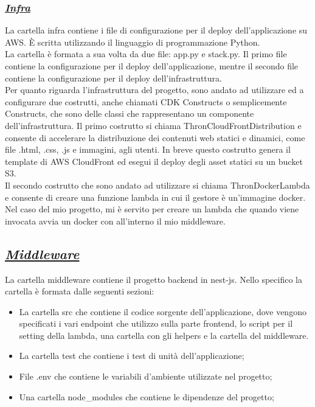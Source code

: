 \subsubsection*{\normalsize\textit{\uline{Infra}}}
La cartella infra contiene i file di configurazione per il deploy dell'applicazione su AWS. È scritta utilizzando il linguaggio di programmazione Python.\\
La cartella è formata a sua volta da due file: app.py e stack.py. Il primo file contiene la configurazione per il deploy dell'applicazione, mentre il secondo file contiene la configurazione per il deploy dell'infrastruttura.\\
Per quanto riguarda l'infrastruttura del progetto, sono andato ad utilizzare ed a configurare due costrutti, anche chiamati CDK Constructs o semplicemente Constructs, che sono delle classi che rappresentano un componente dell'infrastruttura.
Il primo costrutto si chiama ThronCloudFrontDistribution e consente di accelerare la distribuzione dei contenuti web statici e dinamici, come file .html, .css, .js e immagini, agli utenti.
In breve questo costrutto genera il template di AWS CloudFront ed esegui il deploy degli asset statici su un bucket S3.\\
Il secondo costrutto che sono andato ad utilizzare si chiama ThronDockerLambda e consente di creare una funzione lambda in cui il gestore è un'immagine docker.
Nel caso del mio progetto, mi è servito per creare un lambda che quando viene invocata avvia un docker con all'interno il mio middleware.\\

\subsection*{\normalsize\textit{\uline{Middleware}}}
La cartella middleware contiene il progetto backend in nest-js. Nello specifico la cartella è formata dalle seguenti sezioni:
\begin{itemize}
  \item La cartella src che contiene il codice sorgente dell'applicazione, dove vengono specificati i vari endpoint che utilizzo sulla parte frontend, lo script per il setting
  della lambda, una cartella con gli helpers e la cartella del middleware.
  \item La cartella test che contiene i test di unità dell'applicazione;
  \item File .env che contiene le variabili d'ambiente utilizzate nel progetto;
  \item Una cartella node\_modules che contiene le dipendenze del progetto;
\end{itemize}
